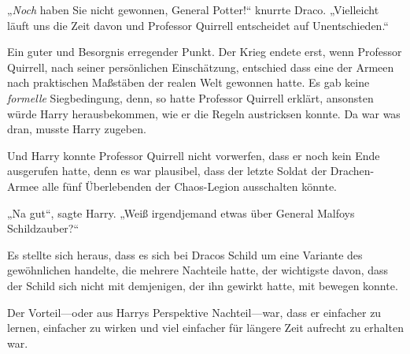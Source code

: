 „\emph{Noch} haben Sie nicht gewonnen, General Potter!“ knurrte Draco.
„Vielleicht läuft uns die Zeit davon und Professor Quirrell entscheidet auf Unentschieden.“

Ein guter und Besorgnis erregender Punkt. Der Krieg endete erst, wenn Professor Quirrell, nach seiner persönlichen Einschätzung, entschied dass eine der Armeen nach praktischen Maßstäben der realen Welt gewonnen hatte. Es gab keine \emph{formelle} Siegbedingung, denn, so hatte Professor Quirrell erklärt, ansonsten würde Harry herausbekommen, wie er die Regeln austricksen konnte. Da war was dran, musste Harry zugeben.

Und Harry konnte Professor Quirrell nicht vorwerfen, dass er noch kein Ende ausgerufen hatte, denn es war plausibel, dass der letzte Soldat der Drachen-Armee alle fünf Überlebenden der Chaos-Legion ausschalten könnte.

„Na gut“, sagte Harry.
„Weiß irgendjemand etwas über General Malfoys Schildzauber?“

Es stellte sich heraus, dass es sich bei Dracos Schild um eine Variante des gewöhnlichen  handelte, die mehrere Nachteile hatte, der wichtigste davon, dass der Schild sich nicht mit demjenigen, der ihn gewirkt hatte, mit bewegen konnte.

Der Vorteil—oder aus Harrys Perspektive Nachteil—war, dass er einfacher zu lernen, einfacher zu wirken und viel einfacher für längere Zeit aufrecht zu erhalten war.


